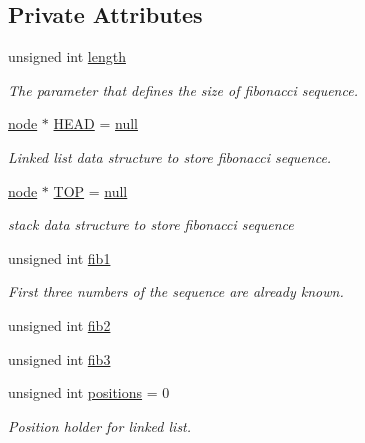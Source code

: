 \subsection*{Private Attributes}
\begin{DoxyCompactItemize}
\item 
unsigned int \mbox{\hyperlink{classFibDigit_a70d34085c62bdfb57390cc0ed04f9574}{length}}
\begin{DoxyCompactList}\small\item\em The parameter that defines the size of fibonacci sequence. \end{DoxyCompactList}\item 
\mbox{\hyperlink{structnode}{node}} $\ast$ \mbox{\hyperlink{classFibDigit_af25e4de406bf87e1a7a3323aaf2355f9}{H\+E\+AD}} = \mbox{\hyperlink{FibDigit_8hpp_ac97b8ee753e4405397a42ad5799b0f9e}{null}}
\begin{DoxyCompactList}\small\item\em Linked list data structure to store fibonacci sequence. \end{DoxyCompactList}\item 
\mbox{\hyperlink{structnode}{node}} $\ast$ \mbox{\hyperlink{classFibDigit_a2c820e980a3e4c69f118f3778fd84206}{T\+OP}} = \mbox{\hyperlink{FibDigit_8hpp_ac97b8ee753e4405397a42ad5799b0f9e}{null}}
\begin{DoxyCompactList}\small\item\em stack data structure to store fibonacci sequence \end{DoxyCompactList}\item 
unsigned int \mbox{\hyperlink{classFibDigit_ab21b28fe63f8cc828d1147539c08f75b}{fib1}}
\begin{DoxyCompactList}\small\item\em First three numbers of the sequence are already known. \end{DoxyCompactList}\item 
unsigned int \mbox{\hyperlink{classFibDigit_ad8d4f9cf0ceaea45d844f719c95762d2}{fib2}}
\item 
unsigned int \mbox{\hyperlink{classFibDigit_a98a33382e322c6455eecdcfb78170417}{fib3}}
\item 
unsigned int \mbox{\hyperlink{classFibDigit_a980e50a82197fa46e104ac2f9208a70b}{positions}} = 0
\begin{DoxyCompactList}\small\item\em Position holder for linked list. \end{DoxyCompactList}\end{DoxyCompactItemize}


